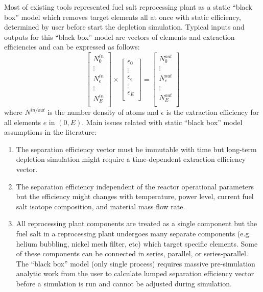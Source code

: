 Most of existing tools represented fuel salt reprocessing plant as a static 
``black box'' model which removes target elements all at once with static 
efficiency, determined by user before start the depletion simulation. 
Typical inputs and outputs for this ``black box'' model are vectors of 
elements and extraction efficiencies and can be expressed as follows:
\begin{equation}
\begin{bmatrix}
N^{in}_{0} \\ \vdots \\ N^{in}_{e} \\ \vdots \\ N^{in}_{E} \\
\end{bmatrix} 
\times
\begin{bmatrix}
\epsilon_{0} \\ \vdots \\ \epsilon_{e} \\ \vdots \\ \epsilon_{E} \\
\end{bmatrix} =
\begin{bmatrix}
N^{out}_{0}\\ \vdots \\ N^{out}_{e} \\ \vdots \\N^{out}_{E}  \\
\end{bmatrix}
\end{equation}
where $N^{in/out}$ is the number density of atoms and $\epsilon$ is the 
extraction efficiency for all elements $e$ in $(0, E)$. Main issues related 
with static ``black box'' model assumptions in the literature: 
\begin{enumerate}
	\item The separation efficiency vector must be immutable with time but  
	long-term depletion simulation might require a time-dependent extraction 
	efficiency vector.
	\item The separation efficiency independent of the reactor operational 
	parameters but the efficiency might changes with temperature, power level, 
	current fuel salt isotope composition, and material mass flow rate.
	\item All reprocessing plant components are treated as a single component 
	but the fuel salt in a reprocessing plant undergoes many separate components  
	(e.g. helium bubbling, nickel mesh filter, etc) which target specific 
	elements. Some of these components can be connected in series, parallel, or 
	series-parallel. The ``black box'' model (only single process) requires 
	massive pre-simulation analytic work from the user to calculate lumped separation 
	efficiency vector before a simulation is run and cannot be adjusted during 
	simulation.	
\end{enumerate}

